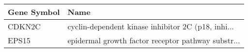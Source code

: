 \begin{tabular}{ll}
\toprule
Gene Symbol &                                               Name \\
\midrule
     CDKN2C & cyclin-dependent kinase inhibitor 2C (p18, inhi... \\
      EPS15 & epidermal growth factor receptor pathway substr... \\
\bottomrule
\end{tabular}
